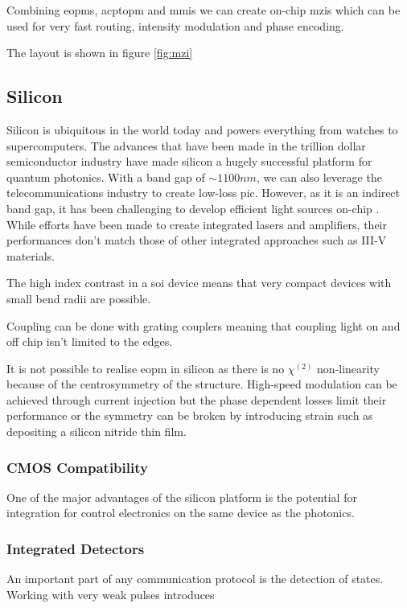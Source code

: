 Combining \acp{eopm}, acp{topm} and \acp{mmi} we can create on-chip \acp{mzi} which can be used for very fast routing, intensity modulation and phase encoding. 

The layout is shown in figure \ref{fig:mzi}

\subsection{Silicon}

Silicon is ubiquitous in the world today and powers everything from watches to supercomputers. The advances that have been made in the trillion dollar semiconductor industry have made silicon a hugely successful platform for quantum photonics. With a band gap of $\sim 1100nm$, we can also leverage the telecommunications industry to create low-loss \acl{pic}. However, as it is an indirect band gap, it has been challenging to develop efficient light sources on-chip \cite{}. While efforts have been made to create integrated lasers and amplifiers, their performances don't match those of other integrated approaches such as III-V materials.

The high index contrast in a \ac{soi} device means that very compact devices with small bend radii are possible.

Coupling can be done with grating couplers meaning that coupling light on and off chip isn't limited to the edges.

It is not possible to realise \ac{eopm} in silicon as there is no $\chi^{(2)}$ non-linearity because of the centrosymmetry of the structure. High-speed modulation can be achieved through current injection but the phase dependent losses limit their performance \cite{} or the symmetry can be broken by introducing strain such as depositing a silicon nitride thin film.

\subsubsection*{CMOS Compatibility}

One of the major advantages of the silicon platform is the potential for integration for control electronics on the same device as the photonics.

\subsubsection*{Integrated Detectors}

An important part of any communication protocol is the detection of states. Working with very weak pulses introduces 

